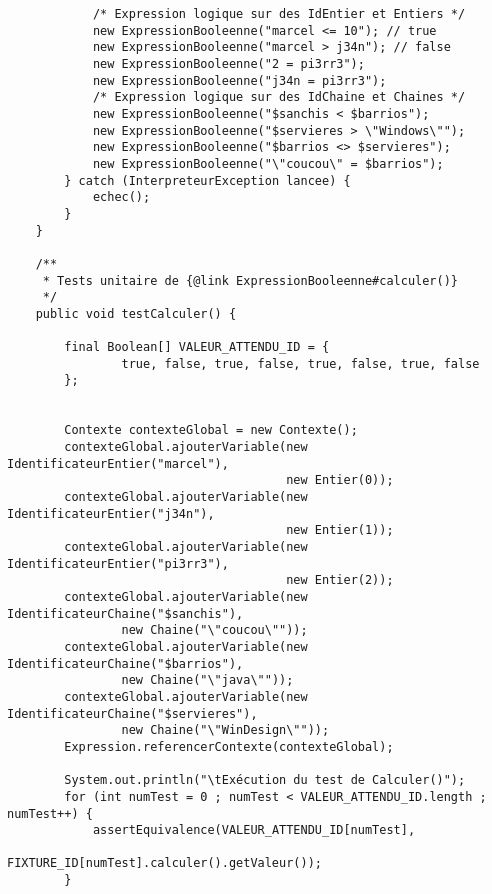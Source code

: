 \begin{enum}
\begin{verbatim}
            /* Expression logique sur des IdEntier et Entiers */
            new ExpressionBooleenne("marcel <= 10"); // true
            new ExpressionBooleenne("marcel > j34n"); // false
            new ExpressionBooleenne("2 = pi3rr3");
            new ExpressionBooleenne("j34n = pi3rr3");
            /* Expression logique sur des IdChaine et Chaines */
            new ExpressionBooleenne("$sanchis < $barrios");
            new ExpressionBooleenne("$servieres > \"Windows\"");
            new ExpressionBooleenne("$barrios <> $servieres");
            new ExpressionBooleenne("\"coucou\" = $barrios");
        } catch (InterpreteurException lancee) {
            echec();
        }
    }
    
    /** 
     * Tests unitaire de {@link ExpressionBooleenne#calculer()}
     */
    public void testCalculer() {
        
        final Boolean[] VALEUR_ATTENDU_ID = {
                true, false, true, false, true, false, true, false
        };
        
        
        Contexte contexteGlobal = new Contexte();
        contexteGlobal.ajouterVariable(new IdentificateurEntier("marcel"),
                                       new Entier(0));
        contexteGlobal.ajouterVariable(new IdentificateurEntier("j34n"),
                                       new Entier(1));
        contexteGlobal.ajouterVariable(new IdentificateurEntier("pi3rr3"),
                                       new Entier(2));
        contexteGlobal.ajouterVariable(new IdentificateurChaine("$sanchis"),
                new Chaine("\"coucou\""));
        contexteGlobal.ajouterVariable(new IdentificateurChaine("$barrios"),
                new Chaine("\"java\""));
        contexteGlobal.ajouterVariable(new IdentificateurChaine("$servieres"),
                new Chaine("\"WinDesign\""));
        Expression.referencerContexte(contexteGlobal);

        System.out.println("\tExécution du test de Calculer()");
        for (int numTest = 0 ; numTest < VALEUR_ATTENDU_ID.length ; numTest++) {
            assertEquivalence(VALEUR_ATTENDU_ID[numTest], 
                              FIXTURE_ID[numTest].calculer().getValeur());
        }
        

\end{verbatim}
\end{enum}
